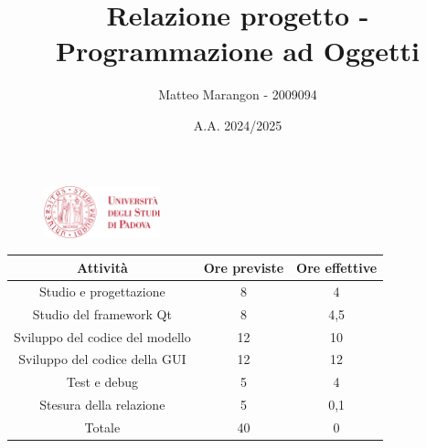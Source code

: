 \documentclass[10pt]{article}
\title{Relazione progetto - Programmazione ad Oggetti}
\author{Matteo Marangon - 2009094}
\date{A.A. 2024/2025}
\begin{document}
\begin{figure}
    \centering
    \includegraphics[width=0.3\textwidth]{./unipdlogo.png}
\end{figure}
\maketitle

\newpage

\tableofcontents
\newpage

\begin{center}
    \begin{tabular}{| c | c | c |} \hline
    Attività & Ore previste & Ore effettive \\\hline
    Studio e progettazione & 8 & 4 \\
    Studio del framework Qt & 8 & 4,5 \\
    Sviluppo del codice del modello & 12 & 10 \\
    Sviluppo del codice della GUI & 12 & 12 \\
    Test e debug & 5 & 4 \\
    Stesura della relazione & 5 & 0,1 \\\hline
    Totale & 40 & 0 \\\hline
    \end{tabular}
\end{center}
\end{document}
